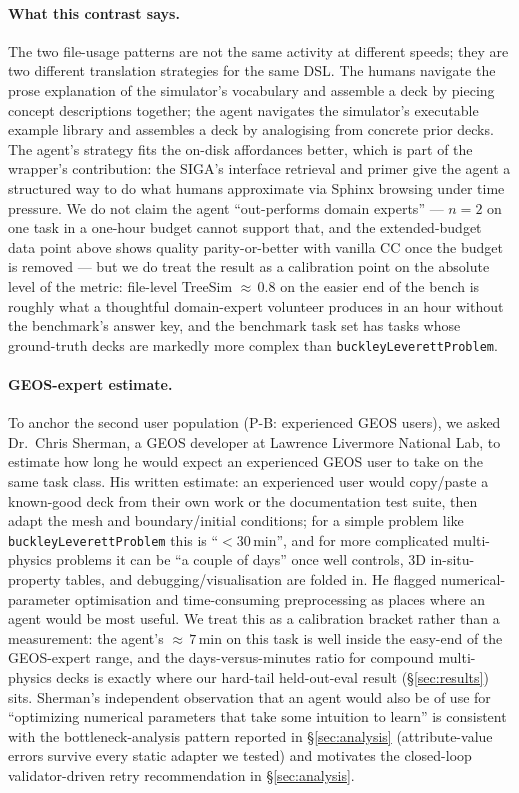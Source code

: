 \documentclass{article}
\begin{document}
\paragraph{What this contrast says.} The two file-usage patterns are not the same activity at different speeds; they are two different translation strategies for the same DSL. The humans navigate the prose explanation of the simulator's vocabulary and assemble a deck by piecing concept descriptions together; the agent navigates the simulator's executable example library and assembles a deck by analogising from concrete prior decks. The agent's strategy fits the on-disk affordances better, which is part of the wrapper's contribution: the SIGA's interface retrieval and primer give the agent a structured way to do what humans approximate via Sphinx browsing under time pressure. We do not claim the agent ``out-performs domain experts'' --- $n=2$ on one task in a one-hour budget cannot support that, and the extended-budget data point above shows quality parity-or-better with vanilla CC once the budget is removed --- but we do treat the result as a calibration point on the absolute level of the metric: file-level TreeSim ${\approx}\,0.8$ on the easier end of the bench is roughly what a thoughtful domain-expert volunteer produces in an hour without the benchmark's answer key, and the benchmark task set has tasks whose ground-truth decks are markedly more complex than \texttt{buckleyLeverettProblem}.

\paragraph{GEOS-expert estimate.} To anchor the second user population (P-B: experienced GEOS users), we asked Dr.~Chris Sherman, a GEOS developer at Lawrence Livermore National Lab, to estimate how long he would expect an experienced GEOS user to take on the same task class. His written estimate: an experienced user would copy/paste a known-good deck from their own work or the documentation test suite, then adapt the mesh and boundary/initial conditions; for a simple problem like \texttt{buckleyLeverettProblem} this is ``${<}30\,$min'', and for more complicated multi-physics problems it can be ``a couple of days'' once well controls, 3D in-situ-property tables, and debugging/visualisation are folded in. He flagged numerical-parameter optimisation and time-consuming preprocessing as places where an agent would be most useful. We treat this as a calibration bracket rather than a measurement: the agent's ${\approx}\,7\,$min on this task is well inside the easy-end of the GEOS-expert range, and the days-versus-minutes ratio for compound multi-physics decks is exactly where our hard-tail held-out-eval result (\S\ref{sec:results}) sits. Sherman's independent observation that an agent would also be of use for ``optimizing numerical parameters that take some intuition to learn'' is consistent with the bottleneck-analysis pattern reported in \S\ref{sec:analysis} (attribute-value errors survive every static adapter we tested) and motivates the closed-loop validator-driven retry recommendation in \S\ref{sec:analysis}.
\end{document}

